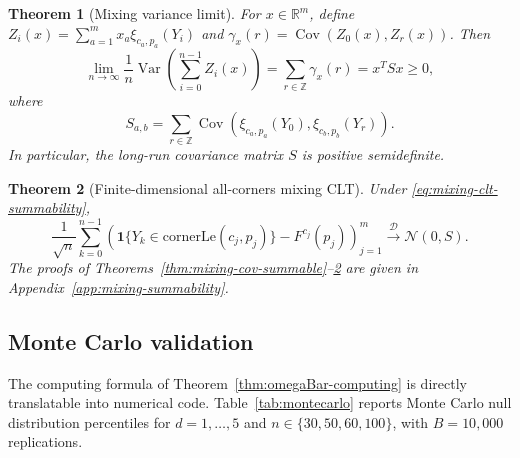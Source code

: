 \documentclass[pdflatex]{sn-jnl}
\theoremstyle{thmstyleone}
\newtheorem{theorem}{Theorem}[section]
\theoremstyle{thmstyletwo}
\theoremstyle{thmstylethree}
\newcommand{\R}{\mathbb{R}}
\newcommand{\Z}{\mathbb{Z}}
\DeclareMathOperator{\Var}{Var}
\DeclareMathOperator{\Cov}{Cov}
\begin{document}
\begin{theorem}[Mixing variance limit]\label{thm:mixing-var-limit}
For $x\in\R^m$, define $Z_i(x)=\sum_{a=1}^m x_a\xi_{c_a,p_a}(Y_i)$ and $\gamma_x(r)=\Cov(Z_0(x),Z_r(x))$. Then
\[
  \lim_{n\to\infty}\frac{1}{n}
  \Var\!\left(\sum_{i=0}^{n-1}Z_i(x)\right)
  =\sum_{r\in\Z}\gamma_x(r)=x^TSx\ge0,
\]
where
\[
  S_{a,b}=\sum_{r\in\Z}
  \Cov\!\left(\xi_{c_a,p_a}(Y_0),\xi_{c_b,p_b}(Y_r)\right).
\]
In particular, the long-run covariance matrix $S$ is positive semidefinite.
\end{theorem}

\begin{theorem}[Finite-dimensional all-corners mixing CLT]\label{thm:mixing-joint-clt}
Under \eqref{eq:mixing-clt-summability},
\[
  \frac{1}{\sqrt n}\sum_{k=0}^{n-1}
  \left(
    \mathbf 1\{Y_k\in\mathrm{cornerLe}(c_j,p_j)\}-F^{c_j}(p_j)
  \right)_{j=1}^m
  \xrightarrow{\;\mathcal D\;}\mathcal N(0,S).
\]
The proofs of Theorems~\ref{thm:mixing-cov-summable}--\ref{thm:mixing-joint-clt} are given in Appendix~\ref{app:mixing-summability}.
\end{theorem}

\subsection{Monte Carlo validation}\label{sec:montecarlo}

The computing formula of Theorem~\ref{thm:omegaBar-computing} is directly translatable into numerical code. Table~\ref{tab:montecarlo} reports Monte Carlo null distribution percentiles for $d=1,\dots,5$ and $n\in\{30,50,60,100\}$, with $B=10{,}000$ replications.
\end{document}
